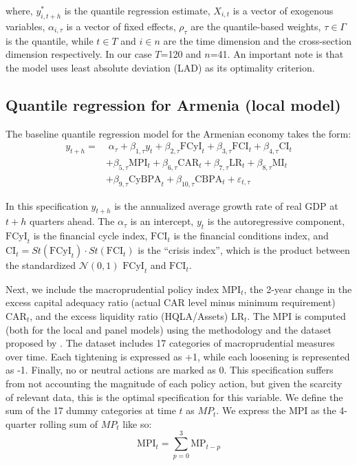 \documentclass[12pt,a4paper]{article}
\begin{document}
where, $y_{i,t+h}^*$ is the quantile regression estimate, $X_{i,t}$ is a vector of exogenous variables, $\alpha_{i, \tau}$ is a vector of fixed effects, $\rho_\tau$ are the quantile-based weights, $\tau\in\Gamma$ is the quantile, while $t\in T$ and $i\in n$ are the time dimension and the cross-section dimension respectively. In our case $T$=120 and $n$=41. An important note is that the model uses least absolute deviation (LAD) as its optimality criterion.

\subsection{Quantile regression for Armenia (local model)}
The baseline quantile regression model for the Armenian economy takes the form:
\begin{equation}
    \label{eq:local_qr}
    \begin{aligned}
    y_{t+h} = 
    &\;\alpha_\tau + \beta_{1, \tau}y_t + \beta_{2, \tau}\text{FCyI}_t + \beta_{3, \tau}\text{FCI}_t + \beta_{4, \tau}\text{CI}_t \\
    &+ \beta_{5, \tau}\text{MPI}_t + \beta_{6, \tau}\text{CAR}_t + \beta_{7, \tau}\text{LR}_t + \beta_{8, \tau}\text{MI}_t \\
    &+ \beta_{9, \tau}\text{CyBPA}_t + \beta_{10, \tau}\text{CBPA}_t + \varepsilon_{t, \tau}
    \end{aligned}
\end{equation}

In this specification $y_{t+h}$ is the annualized average growth rate of real GDP at $t+h$ quarters ahead. The $\alpha_\tau$ is an intercept, $y_t$ is the autoregressive component, $\text{FCyI}_t$ is the financial cycle index, $\text{FCI}_t$ is the financial conditions index, and $\text{CI}_t = St(\text{FCyI}_t) \cdot St(\text{FCI}_t)$ is the ``crisis index'', which is the product between the standardized $\mathcal{N}(0, 1)$ $\text{FCyI}_t$ and $\text{FCI}_t$.

Next, we include the macroprudential policy index $\text{MPI}_t$, the 2-year change in the excess capital adequacy ratio (actual CAR level minus minimum requirement) $\text{CAR}_t$, and the excess liquidity ratio (HQLA/Assets) $\text{LR}_t$. The MPI is computed (both for the local and panel models) using the methodology and the dataset proposed by \citet{alam2019}. The dataset includes 17 categories of macroprudential measures over time. Each tightening is expressed as +1, while each loosening is represented as -1. Finally, no or neutral actions are marked as 0. This specification suffers from not accounting the magnitude of each policy action, but given the scarcity of relevant data, this is the optimal specification for this variable. We define the sum of the 17 dummy categories at time $t$ as $MP_t$. We express the MPI as the 4-quarter rolling sum of $MP_t$ like so:
\begin{equation}
    \label{eq:local_mpi}
    \text{MPI}_t = \sum_{p=0}^{3} \text{MP}_{t-p}
\end{equation}
\end{document}
